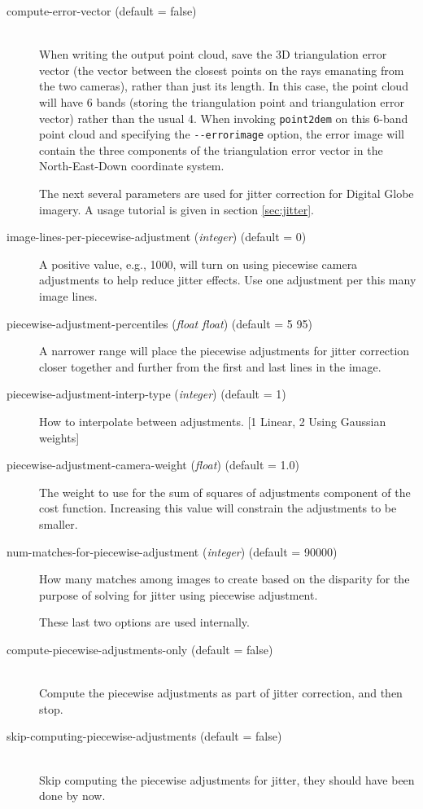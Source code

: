 \begin{description}
\item[compute-error-vector \textnormal (default = false)] \hfill \\

When writing the output point cloud, save the 3D triangulation error
vector (the vector between the closest points on the rays emanating from
the two cameras), rather than just its length. In this case, the point
cloud will have 6 bands (storing the triangulation point and
triangulation error vector) rather than the usual 4. When invoking
\texttt{point2dem} on this 6-band point cloud and specifying the
\texttt{-\/-errorimage} option, the error image will contain the three
components of the triangulation error vector in the North-East-Down
coordinate system.

The next several parameters are used for jitter correction for Digital
Globe imagery. A usage tutorial is given in section \ref{sec:jitter}.

\item[image-lines-per-piecewise-adjustment \textnormal{\small{(\emph{integer})}} (default = 0)]
A positive value, e.g., 1000, will turn on using piecewise camera adjustments to help reduce jitter effects. Use one adjustment per this many image lines.

\item[piecewise-adjustment-percentiles \textnormal{\small{(\emph{float
        float})}} (default = 5 95)]
A narrower range will place the piecewise adjustments for jitter correction closer together and further from the first and last lines in the image.

\item[piecewise-adjustment-interp-type \textnormal{\small{(\emph{integer})}} (default = 1)]
How to interpolate between adjustments. [1 Linear, 2 Using Gaussian weights]

\item[piecewise-adjustment-camera-weight \textnormal{\small{(\emph{float})}} (default = 1.0)]
The weight to use for the sum of squares of adjustments component of the cost function. Increasing this value will constrain the adjustments to be smaller.

\item[num-matches-for-piecewise-adjustment \textnormal{\small{(\emph{integer})}} (default = 90000)]
How many matches among images to create based on the disparity for the purpose of solving for jitter using piecewise adjustment.

These last two options are used internally.

\item[compute-piecewise-adjustments-only \textnormal (default = false)] \hfill \\
Compute the piecewise adjustments as part of jitter correction, and then stop.

\item[skip-computing-piecewise-adjustments \textnormal (default = false)] \hfill \\
Skip computing the piecewise adjustments for jitter, they should have been done by now.

\end{description}

